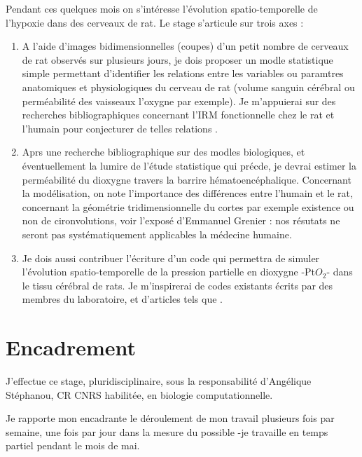 \documentclass[a4paper,10pt]{article}
\begin{document}
\ligneinter
Pendant ces quelques mois on s'int\'eresse  l'\'evolution spatio-temporelle de l'hypoxie dans des cerveaux de rat. Le stage s'articule sur trois axes :
\begin{enumerate}
\item A l'aide d'images bidimensionnelles (coupes) d'un petit nombre de cerveaux de rat observ\'es sur plusieurs jours, %
je dois proposer un modle statistique simple permettant d'identifier les relations entre les variables ou paramtres anatomiques et physiologiques du cerveau de rat %
(volume sanguin c\'er\'ebral ou perm\'eabilit\'e des vaisseaux  l'oxygne par exemple). %
Je m'appuierai sur des recherches bibliographiques concernant l'IRM fonctionnelle chez le rat \cite{her_fn_11} et l'humain pour conjecturer de telles relations \cite{bufr97}.
%
\item Aprs une recherche bibliographique sur des modles biologiques, et \'eventuellement  la lumire de l'\'etude statistique qui pr\'ecde, %
je devrai estimer la perm\'eabilit\'e du dioxygne  travers la barrire h\'ematoenc\'ephalique. %
Concernant la mod\'elisation, on note l'importance des diff\'erences entre l'humain et le rat, concernant la g\'eom\'etrie tridimensionnelle du cortes par exemple %
existence ou non de cironvolutions, voir l'expos\'e d'Emmanuel Grenier \cite{gredp} : nos r\'esutats ne seront pas syst\'ematiquement applicables  la m\'edecine humaine.
%
\item Je dois aussi contribuer  l'\'ecriture d'un code qui permettra de simuler l'\'evolution spatio-temporelle de la pression partielle en dioxygne %
-Pt$O_2$- dans le tissu c\'er\'ebral de rats. Je m'inspirerai de codes existants \'ecrits par des membres du laboratoire, et d'articles tels que \cite{kel_PMB_06}.
\end{enumerate}

\newpage
\section{Encadrement}

J'effectue ce stage, pluridisciplinaire, sous la responsabilit\'e d'Ang\'elique St\'ephanou, CR CNRS habilit\'ee, en biologie computationnelle.

\par
Je rapporte  mon encadrante le d\'eroulement de mon travail plusieurs fois par semaine, une fois par jour dans la mesure du possible -je travaille en temps partiel pendant le mois de mai.
\end{document}
